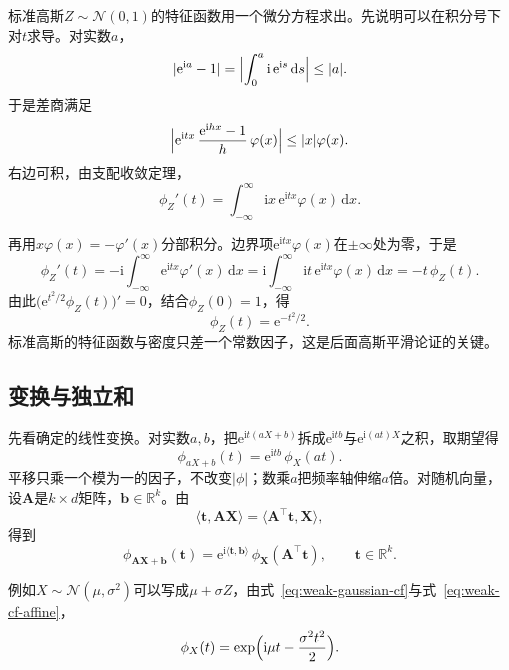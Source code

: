 标准高斯$Z\sim\mathcal{N}(0,1)$的特征函数用一个微分方程求出。先说明可以在积分号下对$t$求导。对实数$a$，
\[
 \lvert\mathrm{e}^{\mathrm{i}a}-1\rvert=\Bigl\lvert\int_0^a\mathrm{i}\,\mathrm{e}^{\mathrm{i}s}\,\mathrm{d}s\Bigr\rvert\leq\lvert a\rvert .
\]
于是差商满足
\[
 \Bigl\lvert\mathrm{e}^{\mathrm{i}tx}\,\frac{\mathrm{e}^{\mathrm{i}hx}-1}{h}\,\varphi(x)\Bigr\rvert\leq\lvert x\rvert\varphi(x) .
\]
右边可积，由支配收敛定理，
\[
 \phi_Z'(t)=\int_{-\infty}^{\infty}\mathrm{i}x\,\mathrm{e}^{\mathrm{i}tx}\varphi(x)\,\mathrm{d}x .
\]

再用$x\varphi(x)=-\varphi'(x)$分部积分。边界项$\mathrm{e}^{\mathrm{i}tx}\varphi(x)$在$\pm\infty$处为零，于是
\[
 \phi_Z'(t)=-\mathrm{i}\int_{-\infty}^{\infty}\mathrm{e}^{\mathrm{i}tx}\varphi'(x)\,\mathrm{d}x=\mathrm{i}\int_{-\infty}^{\infty}\mathrm{i}t\,\mathrm{e}^{\mathrm{i}tx}\varphi(x)\,\mathrm{d}x=-t\,\phi_Z(t) .
\]
由此$\bigl(\mathrm{e}^{t^2/2}\phi_Z(t)\bigr)'=0$，结合$\phi_Z(0)=1$，得
\begin{equation}
 \phi_Z(t)=\mathrm{e}^{-t^2/2} .
 \label{eq:weak-gaussian-cf}
\end{equation}
标准高斯的特征函数与密度只差一个常数因子，这是后面高斯平滑论证的关键。

\subsection{变换与独立和}
\label{sec:weak-cf-operations}

先看确定的线性变换。对实数$a,b$，把$\mathrm{e}^{\mathrm{i}t(aX+b)}$拆成$\mathrm{e}^{\mathrm{i}tb}$与$\mathrm{e}^{\mathrm{i}(at)X}$之积，取期望得
\begin{equation}
 \phi_{aX+b}(t)=\mathrm{e}^{\mathrm{i}tb}\,\phi_X(at) .
 \label{eq:weak-cf-affine}
\end{equation}
平移只乘一个模为一的因子，不改变$\lvert\phi\rvert$；数乘$a$把频率轴伸缩$a$倍。对随机向量，设$\bm{A}$是$k\times d$矩阵，$\bm{b}\in\mathbb{R}^{k}$。由
\[
 \langle\bm{t},\bm{A}\bm{X}\rangle=\langle\bm{A}^{\top}\bm{t},\bm{X}\rangle ,
\]
得到
\begin{equation}
 \phi_{\bm{A}\bm{X}+\bm{b}}(\bm{t})=\mathrm{e}^{\mathrm{i}\langle\bm{t},\bm{b}\rangle}\,\phi_{\bm{X}}(\bm{A}^{\top}\bm{t}),\qquad\bm{t}\in\mathbb{R}^{k} .
 \label{eq:weak-cf-linear}
\end{equation}

例如$X\sim\mathcal{N}(\mu,\sigma^2)$可以写成$\mu+\sigma Z$，由式~\eqref{eq:weak-gaussian-cf}与式~\eqref{eq:weak-cf-affine}，
\[
 \phi_X(t)=\exp\Bigl(\mathrm{i}\mu t-\frac{\sigma^2t^2}{2}\Bigr) .
\]

